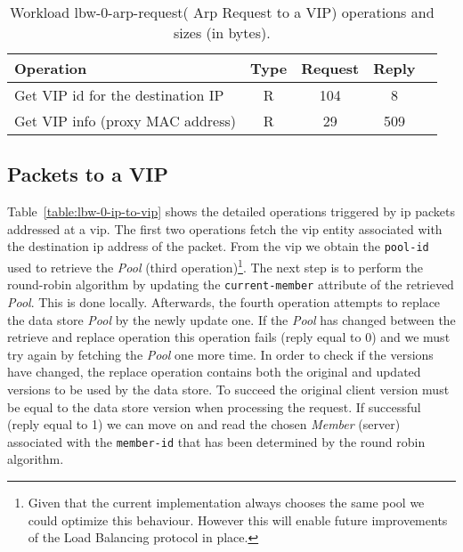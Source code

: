 \begin{table}[ht]
\small
\centering 
\begin{tabular}{l c c c c}
Operation & Type & Request & Reply \\ \toprule 
Get VIP id for the destination IP  & R & 104 & 8\\
Get VIP info (proxy MAC address) & R & 29 & 509 \\\bottomrule
\end{tabular}\caption[Workload lbw-0-arp-request( Arp Request to a
VIP) operations]{Workload lbw-0-arp-request( Arp Request to a VIP)
 operations and sizes (in bytes).}
\label{table:lbw-0-arp-request}
\end{table}


\subsection{Packets to a VIP}
Table~\ref{table:lbw-0-ip-to-vip} shows the detailed operations triggered by \gls{ip}  packets addressed at a \gls{vip}. 
The first two operations fetch the \gls{vip} entity associated with the destination \gls{ip} address of the packet. 
From the \gls{vip} we obtain the \texttt{pool-id} used to retrieve the \emph{Pool} (third operation)\footnote{Given that the current implementation always chooses the same  pool we could optimize this behaviour. However this will enable future improvements of the Load Balancing protocol in place.}. 
The next step is to perform the round-robin algorithm by updating the \texttt{current-member} attribute of the retrieved \emph{Pool}. 
This is done locally. 
Afterwards, the fourth operation attempts to replace the data store \emph{Pool} by the newly update one. 
If the \emph{Pool} has changed between the retrieve and replace operation this operation fails (reply equal to 0) and we must try again by fetching the \emph{Pool} one more time. In order to check if the versions have changed, the replace operation contains both the original and updated versions to be used by the data store. 
To succeed the original client version must be equal to the data store version when processing the request.
If successful (reply equal to 1) we can move on and read the chosen \emph{Member} (server) associated with the \texttt{member-id}  that has been determined by the round robin algorithm. 

